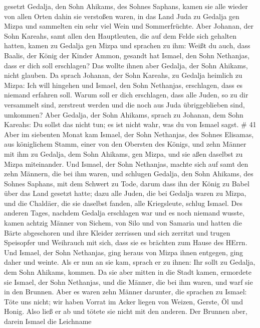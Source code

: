 gesetzt Gedalja, den Sohn Ahikams, des Sohnes Saphans, 
kamen sie alle wieder von allen Orten dahin sie verstoßen waren, in das
Land Juda zu Gedalja gen Mizpa und sammelten ein sehr viel Wein und
Sommerfrüchte.  Aber Johanan, der Sohn Kareahs, samt allen
den Hauptleuten, die auf dem Felde sich gehalten hatten, kamen zu
Gedalja gen Mizpa  und sprachen zu ihm: Weißt du auch, dass
Baalis, der König der Kinder Ammon, gesandt hat Ismael, den Sohn
Nethanjas, dass er dich soll erschlagen? Das wollte ihnen aber Gedalja,
der Sohn Ahikams, nicht glauben.  Da sprach Johanan, der
Sohn Kareahs, zu Gedalja heimlich zu Mizpa: Ich will hingehen und
Ismael, den Sohn Nethanjas, erschlagen, dass es niemand erfahren soll.
Warum soll er dich erschlagen, dass alle Juden, so zu dir versammelt
sind, zerstreut werden und die noch aus Juda übriggeblieben sind,
umkommen?  Aber Gedalja, der Sohn Ahikams, sprach zu
Johanan, dem Sohn Kareahs: Du sollst das nicht tun; es ist nicht wahr,
was du von Ismael sagst. \# 41  Aber im siebenten Monat kam
Ismael, der Sohn Nethanjas, des Sohnes Elisamas, aus königlichem Stamm,
einer von den Obersten des Königs, und zehn Männer mit ihm zu Gedalja,
dem Sohn Ahikams, gen Mizpa, und sie aßen daselbst zu Mizpa miteinander.
 Und Ismael, der Sohn Nethanjas, machte sich auf samt den
zehn Männern, die bei ihm waren, und schlugen Gedalja, den Sohn Ahikams,
des Sohnes Saphans, mit dem Schwert zu Tode, darum dass ihn der König zu
Babel über das Land gesetzt hatte;  dazu alle Juden, die bei
Gedalja waren zu Mizpa, und die Chaldäer, die sie daselbst fanden, alle
Kriegsleute, schlug Ismael.  Des anderen Tages, nachdem
Gedalja erschlagen war und es noch niemand wusste,  kamen
achtzig Männer von Sichem, von Silo und von Samaria und hatten die Bärte
abgeschoren und ihre Kleider zerrissen und sich zerritzt und trugen
Speisopfer und Weihrauch mit sich, dass sie es brächten zum Hause des
HErrn.  Und Ismael, der Sohn Nethanjas, ging heraus von
Mizpa ihnen entgegen, ging daher und weinte. Als er nun an sie kam,
sprach er zu ihnen: Ihr sollt zu Gedalja, dem Sohn Ahikams, kommen.
 Da sie aber mitten in die Stadt kamen, ermordete sie
Ismael, der Sohn Nethanjas, und die Männer, die bei ihm waren, und warf
sie in den Brunnen.  Aber es waren zehn Männer darunter, die
sprachen zu Ismael: Töte uns nicht; wir haben Vorrat im Acker liegen von
Weizen, Gerste, Öl und Honig. Also ließ er ab und tötete sie nicht mit
den anderen.  Der Brunnen aber, darein Ismael die Leichname
